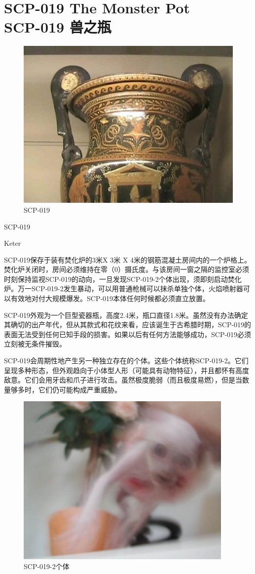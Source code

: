 \chapter[SCP-019 兽之瓶]{
    SCP-019 The Monster Pot\\
    SCP-019 兽之瓶
}

\label{chap:SCP-019}

\begin{figure}[H]
    \centering
    \includegraphics[width=0.5\linewidth]{images/SCP.019.jpg}
    \caption*{SCP-019}
\end{figure}

SCP-019

Keter

SCP-019保存于装有焚化炉的3米X 3米 X 4米的钢筋混凝土房间内的一个炉格上。焚化炉关闭时，房间必须维持在零（0）摄氏度。与该房间一窗之隔的监控室必须时刻保持监视SCP-019的动向，一旦发现SCP-019-2个体出现，须即刻启动焚化炉。万一SCP-019-2发生暴动，可以用普通枪械可以抹杀单独个体，火焰喷射器可以有效地对付大规模爆发。SCP-019本体任何时候都必须直立放置。

SCP-019外观为一个巨型瓷器瓶，高度2.4米，瓶口直径1.8米。虽然没有办法确定其确切的出产年代，但从其款式和花纹来看，应该诞生于古希腊时期，SCP-019的表面无法受到任何已知手段的损害。如果以后有任何方法能够成功，SCP-019必须立刻被无条件摧毁。

SCP-019会周期性地产生另一种独立存在的个体。这些个体统称SCP-019-2。它们呈现多种形态，但外观趋向于小体型人形（可能具有动物特征），并且都怀有高度敌意。它们会用牙齿和爪子进行攻击。虽然极度脆弱（而且极度易燃），但是当数量够多时，它们仍可能构成严重威胁。

\begin{figure}[H]
    \centering
    \includegraphics[width=0.5\linewidth]{images/SCP.019.2.jpg}
    \caption*{SCP-019-2个体}
\end{figure}

